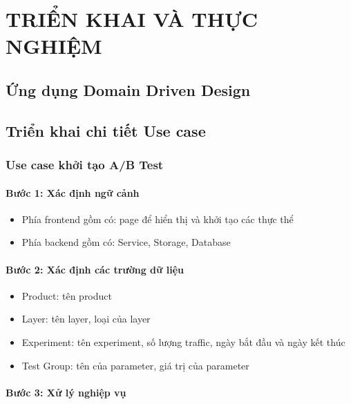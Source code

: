 \chapter{TRIỂN KHAI VÀ THỰC NGHIỆM}

\section{Ứng dụng Domain Driven Design}

\section{Triển khai chi tiết Use case}

\subsection{Use case khởi tạo A/B Test}

\subsubsection{Bước 1: Xác định ngữ cảnh}

\begin{itemize}
	\item Phía frontend gồm có: page để hiển thị và khởi tạo các thực thể
	\item Phía backend gồm có: Service, Storage, Database
\end{itemize}

\subsubsection{Bước 2: Xác định các trường dữ liệu}

\begin{itemize}
	\item Product: tên product
	\item Layer: tên layer, loại của layer
	\item Experiment: tên experiment, số lượng traffic, ngày bắt đầu và ngày kết thúc
	\item Test Group: tên của parameter, giá trị của parameter
\end{itemize}

\subsubsection{Bước 3: Xử lý nghiệp vụ}


